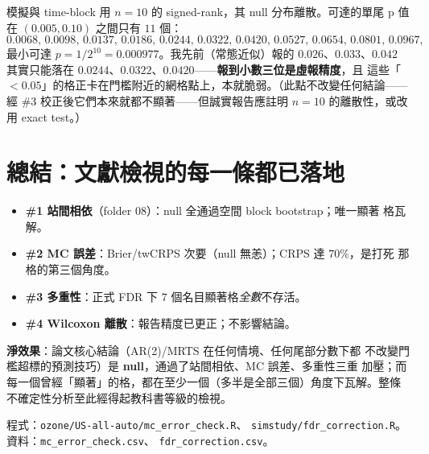 \documentclass[12pt]{article}
\begin{document}
模擬與 time-block 用 $n=10$ 的 signed-rank，其 null 分布離散。可達的單尾 p 值在
$(0.005,0.10)$ 之間只有 $11$ 個：
\[
  0.0068,\,0.0098,\,0.0137,\,0.0186,\,\mathbf{0.0244},\,\mathbf{0.0322},\,
  \mathbf{0.0420},\,0.0527,\,0.0654,\,0.0801,\,0.0967,
\]
最小可達 $p=1/2^{10}=0.000977$。我先前（常態近似）報的 $0.026$、$0.033$、$0.042$
其實只能落在 $0.0244$、$0.0322$、$0.0420$——\textbf{報到小數三位是虛報精度}，且
這些「$<0.05$」的格正卡在門檻附近的網格點上，本就脆弱。（此點不改變任何結論——
經 \#3 校正後它們本來就都不顯著——但誠實報告應註明 $n=10$ 的離散性，或改用
exact test。）

\section*{總結：文獻檢視的每一條都已落地}

\begin{itemize}
  \item \textbf{\#1 站間相依}（folder 08）：null 全通過空間 block bootstrap；唯一顯著
        格瓦解。
  \item \textbf{\#2 MC 誤差}：Brier/twCRPS 次要（null 無恙）；CRPS 達 $70\%$，是打死
        那格的第三個角度。
  \item \textbf{\#3 多重性}：正式 FDR 下 $7$ 個名目顯著格\emph{全數}不存活。
  \item \textbf{\#4 Wilcoxon 離散}：報告精度已更正；不影響結論。
\end{itemize}

\noindent\textbf{淨效果}：論文核心結論（AR(2)/MRTS 在任何情境、任何尾部分數下都
不改變門檻超標的預測技巧）是 \textbf{null}，通過了站間相依、MC 誤差、多重性三重
加壓；而每一個曾經「顯著」的格，都在至少一個（多半是全部三個）角度下瓦解。整條
不確定性分析至此經得起教科書等級的檢視。

\medskip
\noindent\footnotesize 程式：\verb|ozone/US-all-auto/mc_error_check.R|、
\verb|simstudy/fdr_correction.R|。資料：\verb|mc_error_check.csv|、
\verb|fdr_correction.csv|。
\end{document}
